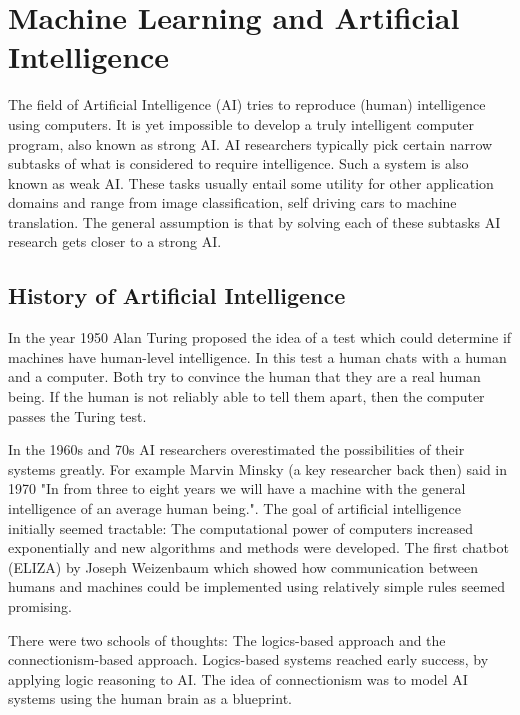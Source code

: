 \documentclass[draft,final,oneside]{vutinfth} %
\begin{document}
\section{Machine Learning and Artificial Intelligence}
The field of Artificial Intelligence (AI) tries to reproduce (human) intelligence using computers. It is yet impossible to develop a truly intelligent computer program, also known as strong AI. AI researchers typically pick certain narrow subtasks of what is considered to require intelligence. Such a system is also known as weak AI. These tasks usually entail some utility for other application domains and range from image classification, self driving cars to machine translation. The general assumption is that by solving each of these subtasks AI research gets closer to a strong AI.

\subsection{History of Artificial Intelligence}

In the year 1950 Alan Turing proposed the idea of a test which could determine if machines have human-level intelligence. In this test a human chats with a human and a computer. Both try to convince the human that they are a real human being. If the human is not reliably able to tell them apart, then the computer passes the Turing test. 

In the 1960s and 70s AI researchers overestimated the possibilities of their systems greatly. For example Marvin Minsky (a key researcher back then) said in 1970 "In from three to eight years we will have a machine with the general intelligence of an average human being.". The goal of artificial intelligence initially seemed tractable:
The computational power of computers increased exponentially and new algorithms and methods were developed. The first chatbot (ELIZA) by Joseph Weizenbaum which showed how communication between humans and machines could be implemented using relatively simple rules seemed promising.

There were two schools of thoughts: The logics-based approach and the connectionism-based approach. Logics-based systems reached early success, by applying logic reasoning to AI. The idea of connectionism was to model AI systems using the human brain as a blueprint.
\end{document}
